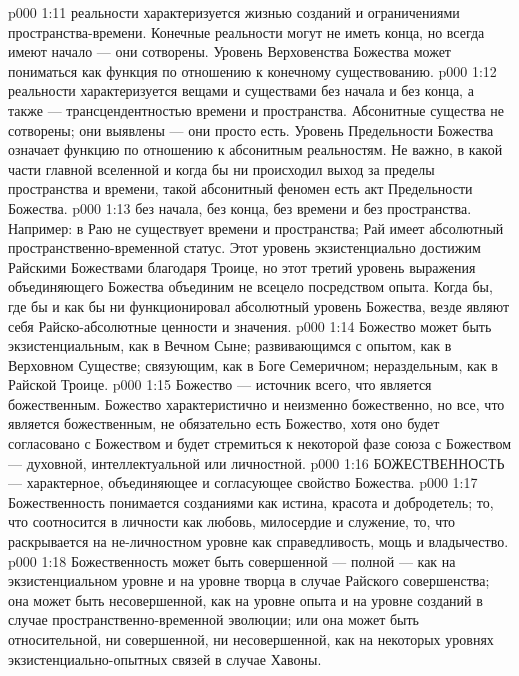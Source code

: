 \vs p000 1:11 \pc {} реальности характеризуется жизнью созданий и ограничениями пространства\hyp{}времени. Конечные реальности могут не иметь конца, но всегда имеют начало --- они сотворены. Уровень Верховенства Божества может пониматься как функция по отношению к конечному существованию.
\vs p000 1:12 \pc {} реальности характеризуется вещами и существами без начала и без конца, а также --- трансцендентностью времени и пространства. Абсонитные существа не сотворены; они выявлены --- они просто есть. Уровень Предельности Божества означает функцию по отношению к абсонитным реальностям. Не важно, в какой части главной вселенной и когда бы ни происходил выход за пределы пространства и времени, такой абсонитный феномен есть акт Предельности Божества.
\vs p000 1:13 \pc {} без начала, без конца, без времени и без пространства. Например: в Раю не существует времени и пространства; Рай имеет абсолютный пространственно\hyp{}временной статус. Этот уровень экзистенциально достижим Райскими Божествами благодаря Троице, но этот третий уровень выражения объединяющего Божества объединим не всецело посредством опыта. Когда бы, где бы и как бы ни функционировал абсолютный уровень Божества, везде являют себя Райско\hyp{}абсолютные ценности и значения.
\vs p000 1:14 \pc Божество может быть экзистенциальным, как в Вечном Сыне; развивающимся с опытом, как в Верховном Существе; связующим, как в Боге Семеричном; нераздельным, как в Райской Троице.
\vs p000 1:15 Божество --- источник всего, что является божественным. Божество характеристично и неизменно божественно, но все, что является божественным, не обязательно есть Божество, хотя оно будет согласовано с Божеством и будет стремиться к некоторой фазе союза с Божеством --- духовной, интеллектуальной или личностной.
\vs p000 1:16 \pc БОЖЕСТВЕННОСТЬ --- характерное, объединяющее и согласующее свойство Божества.
\vs p000 1:17 Божественность понимается созданиями как истина, красота и добродетель; то, что соотносится в личности как любовь, милосердие и служение, то, что раскрывается на не\hyp{}личностном уровне как справедливость, мощь и владычество.
\vs p000 1:18 Божественность может быть совершенной --- полной --- как на экзистенциальном уровне и на уровне творца в случае Райского совершенства; она может быть несовершенной, как на уровне опыта и на уровне созданий в случае пространственно\hyp{}временной эволюции; или она может быть относительной, ни совершенной, ни несовершенной, как на некоторых уровнях экзистенциально\hyp{}опытных связей в случае Хавоны.
